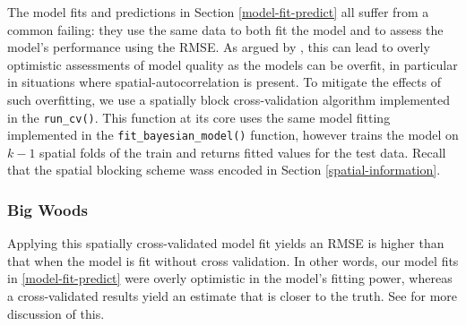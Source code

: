 \documentclass[12pt]{article}
\newenvironment{Shaded}{\begin{snugshade}}{\end{snugshade}}
\newcommand{\CommentTok}[1]{\textcolor[rgb]{0.56,0.35,0.01}{\textit{#1}}}
\newcommand{\DataTypeTok}[1]{\textcolor[rgb]{0.13,0.29,0.53}{#1}}
\newcommand{\KeywordTok}[1]{\textcolor[rgb]{0.13,0.29,0.53}{\textbf{#1}}}
\newcommand{\NormalTok}[1]{#1}
\newcommand{\OperatorTok}[1]{\textcolor[rgb]{0.81,0.36,0.00}{\textbf{#1}}}
\newcommand{\StringTok}[1]{\textcolor[rgb]{0.31,0.60,0.02}{#1}}
\begin{document}
The model fits and predictions in Section \ref{model-fit-predict} all
suffer from a common failing: they use the same data to both fit the
model and to assess the model's performance using the RMSE. As argued by
\citet{roberts_cross-validation_2017}, this can lead to overly
optimistic assessments of model quality as the models can be overfit, in
particular in situations where spatial-autocorrelation is present. To
mitigate the effects of such overfitting, we use a spatially block
cross-validation algorithm implemented in the \texttt{run\_cv()}. This
function at its core uses the same model fitting implemented in the
\texttt{fit\_bayesian\_model()} function, however trains the model on
\(k-1\) spatial folds of the train and returns fitted values for the
test data. Recall that the spatial blocking scheme wass encoded in
Section \ref{spatial-information}.

\hypertarget{big-woods-5}{%
\subsubsection{Big Woods}\label{big-woods-5}}

Applying this spatially cross-validated model fit yields an RMSE is
higher than that when the model is fit without cross validation. In
other words, our model fits in \ref{model-fit-predict} were overly
optimistic in the model's fitting power, whereas a cross-validated
results yield an estimate that is closer to the truth. See
\citet{allen_permutation_2020} for more discussion of this.

\begin{Shaded}
\end{Shaded}
\end{document}
